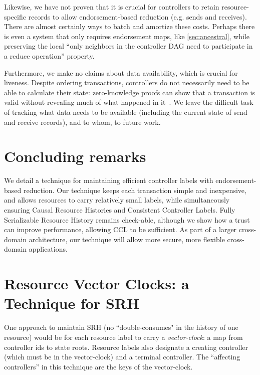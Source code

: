 \documentclass[a4paper,USenglish,cleveref, autoref, thm-restate, anonymous]{lipics-v2021}
\begin{document}
Likewise, we have not proven that it is crucial for controllers to retain resource-specific records to allow endorsement-based reduction (e.g. sends and receives).
There are almost certainly ways to batch and amortize these costs.
Perhaps there is even a system that only requires endorsement maps, like \cref{sec:ancestral}, while preserving the local ``only neighbors in the controller DAG need to participate in a reduce operation'' property. 

Furthermore, we make no claims about data availability, which is crucial for liveness.
Despite ordering transactions, controllers do not necessarily need to be able to calculate their state: zero-knowledge proofs can show that a transaction is valid without revealing much of what happened in it~\cite{nova,resource}.
We leave the difficult task of tracking what data needs to be available (including the current state of send and receive records), and to whom, to future work. 

 
\section{Concluding remarks}
We detail a technique for maintaining efficient controller labels with endorsement-based reduction.
Our technique keeps each transaction simple and inexpensive, and allows resources to carry relatively small labels, while simultaneously ensuring Causal Resource Histories and Consistent Controller Labels.
Fully Serializable Resource History remains check-able, although we show how a trust can improve performance, allowing CCL to be sufficient.
As part of a larger cross-domain architecture, our technique will allow more secure, more flexible cross-domain applications.






\appendix


\section{Resource Vector Clocks: a Technique for SRH}
\label{sec:resourcevectorclocks}
One approach to maintain SRH (no ``double-consumes" in the history of one resource) would be for each resource label to carry a \textit{vector-clock}: a map from controller ids to state roots. 
Resource labels also designate a creating controller (which must be in the vector-clock) and a terminal controller.
The ``affecting controllers'' in this technique are the keys of the vector-clock.
\end{document}
